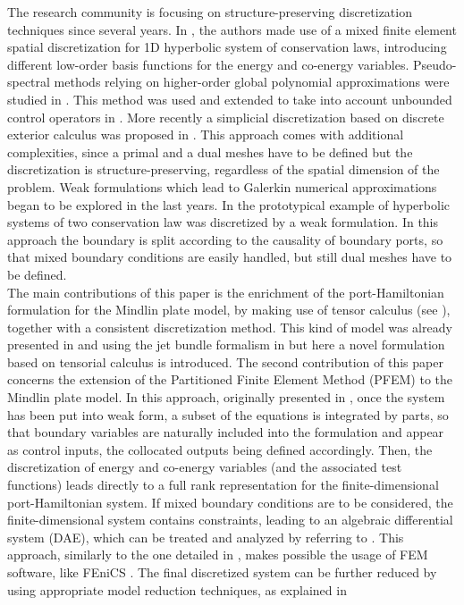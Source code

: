 \documentclass[11pt]{article}
\begin{document}
	The research community is focusing on structure-preserving discretization techniques since several years. In \cite{Golo}, the authors made use of a mixed finite element spatial discretization for 1D hyperbolic system of conservation laws, introducing different low-order basis functions for the energy and co-energy variables. Pseudo-spectral methods relying on higher-order global polynomial approximations were studied in \cite{moulla:hal-01625008}. This method was used and extended to take into account unbounded control operators in \cite{articleFlavio}. More recently a simplicial discretization based on discrete exterior calculus was proposed in \cite{SESLIJA20121509}. This approach comes with additional complexities, since a primal and a dual meshes have to be defined but the discretization is structure-preserving, regardless of the spatial dimension of the problem. Weak formulations which lead to Galerkin numerical approximations began to be explored in the last years. In \cite{WeakForm_Kot} the prototypical example of hyperbolic systems of two conservation law was discretized by a weak formulation. In this approach the boundary is split according to the causality of boundary ports, so that mixed boundary conditions are easily handled, but still dual meshes have to be defined.  \\
	
	The main contributions of this paper is the enrichment of the port-Hamiltonian formulation for the Mindlin plate model, by making use of tensor calculus (see \cite[Chapter~16]{Grinfield}), together with a consistent discretization method.  This kind of model was already presented in \cite{MacchelliMindlin} and {using the jet bundle formalism in \cite{jetMin}} but here a novel formulation based on tensorial calculus is introduced.  The second contribution of this paper concerns the extension of the Partitioned Finite Element Method (PFEM) to the Mindlin plate model. In this approach, originally presented in \cite{CardosoRibeiro2018}, once the system has been put into weak form, a subset of the equations is integrated by parts, so that boundary variables are naturally included into the formulation and appear as control inputs, the collocated outputs being defined accordingly. Then, the discretization of energy and co-energy variables (and the associated test functions) leads directly to a full rank representation for the finite-dimensional port-Hamiltonian system. If mixed boundary conditions are to be considered, the finite-dimensional system contains constraints, leading to an algebraic differential system (DAE), which can be treated and analyzed by referring to \cite{vanderSchaft2013, beattie2018linear}. This approach, similarly to the one detailed in \cite{WeakForm_Kot}, makes possible the usage of FEM software, like FEniCS \cite{LoggMardalEtAl2012}. The final discretized system can be further reduced by using appropriate model reduction techniques, as explained in \cite{TONG20132727, Mehrmann2018}  \\
	
\end{document}
